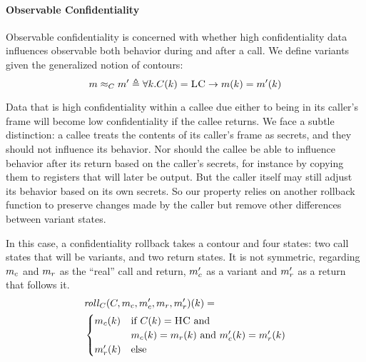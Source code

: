 \documentclass[acmsmall,review,anonymous]{acmart}\settopmatter{printfolios=true,printccs=false,printacmref=false}
\begin{document}
      
    \paragraph{Observable Confidentiality}

      Observable confidentiality is concerned with whether high confidentiality data influences
      observable both behavior during and after a call. We define variants given the generalized notion
      of contours:
      \[m \approx_C m' \triangleq \forall k .
      C(k) = \textsc{LC} \rightarrow m(k) = m'(k)\]

      Data that is high confidentiality within a callee due either to being in its caller's frame
      will become low confidentiality if the callee returns. We face a subtle distinction: 
      a callee treats the contents of its caller's frame as secrets, and they should not influence
      its behavior. Nor should the callee be able to influence behavior after its return based
      on the caller's secrets, for instance by copying them to registers that will later be output.
      But the caller itself may still adjust its behavior based on its own secrets. So our property
      relies on another rollback function to preserve changes made by the caller but remove other
      differences between variant states.

      In this case, a confidentiality rollback takes a contour and four states: two call states
      that will be variants, and two return states. It is not symmetric, regarding \(m_c\) and \(m_r\)
      as the ``real'' call and return, \(m_c'\) as a variant and \(m_r'\) as a return that follows it.
      \[\begin{split}
        & \mathit{roll}_C(C,m_c,m_c',m_r,m_r')(k) = \\
        & \begin{cases}
          m_c(k) & \text{if } C(k) = \textsc{HC} \text{ and } \\
                  & m_c(k) = m_r(k) \text{ and }
                    m_c'(k) = m_r'(k) \\
          m_r'(k) & \text{else} \\
        \end{cases}
      \end{split}\]
\end{document}
